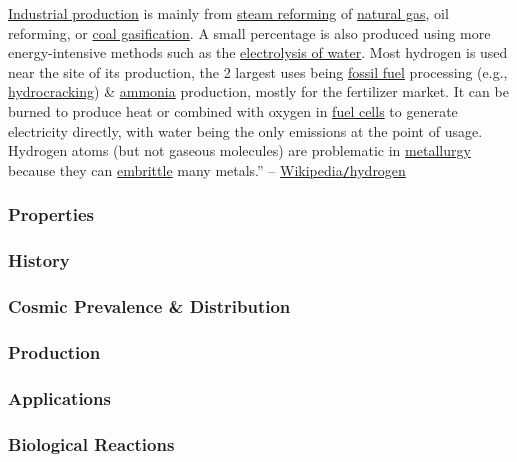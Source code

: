 \documentclass{article}
\begin{document}
\href{https://en.wikipedia.org/wiki/Hydrogen_production}{Industrial production} is mainly from \href{https://en.wikipedia.org/wiki/Steam_reforming}{steam reforming} of \href{https://en.wikipedia.org/wiki/Natural_gas}{natural gas}, oil reforming, or \href{https://en.wikipedia.org/wiki/Coal_gasification}{coal gasification}. A small percentage is also produced using more energy-intensive methods such as the \href{https://en.wikipedia.org/wiki/Electrolysis_of_water}{electrolysis of water}. Most hydrogen is used near the site of its production, the 2 largest uses being \href{https://en.wikipedia.org/wiki/Fossil_fuel}{fossil fuel} processing (e.g., \href{https://en.wikipedia.org/wiki/Hydrocracking}{hydrocracking}) \& \href{https://en.wikipedia.org/wiki/Ammonia}{ammonia} production, mostly for the fertilizer market. It can be burned to produce heat or combined with oxygen in \href{https://en.wikipedia.org/wiki/Fuel_cells}{fuel cells} to generate electricity directly, with water being the only emissions at the point of usage. Hydrogen atoms (but not gaseous molecules) are problematic in \href{https://en.wikipedia.org/wiki/Metallurgy}{metallurgy} because they can \href{https://en.wikipedia.org/wiki/Hydrogen_embrittlement}{embrittle} many metals.'' -- \href{https://en.wikipedia.org/wiki/Hydrogen}{Wikipedia\texttt{/}hydrogen}

\subsubsection{Properties}

\subsubsection{History}

\subsubsection{Cosmic Prevalence \& Distribution}

\subsubsection{Production}

\subsubsection{Applications}

\subsubsection{Biological Reactions}
\end{document}

